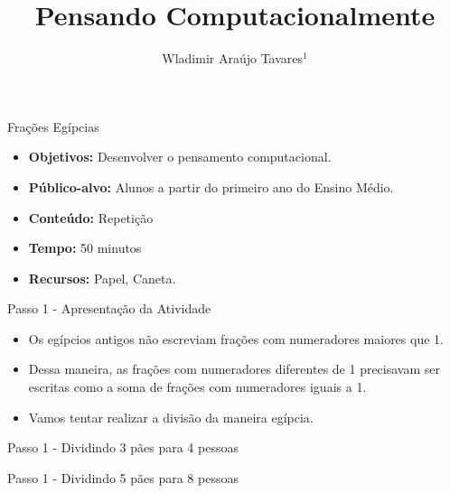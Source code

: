 \documentclass{beamer}
\title {Pensando Computacionalmente}
\author[Wladimir Araújo Tavares]{ Wladimir Araújo Tavares$^{1}$  }
\institute[UFC]{$^{1}$Universidade Federal do Ceará - Campus de Quixadá\\}
\date{}
\begin{document}
\begin{frame}
	\titlepage
\end{frame}




\begin{frame}{Frações Egípcias}

\begin{itemize}
\item \textbf{Objetivos:} Desenvolver o pensamento computacional.

\item \textbf{Público-alvo:}  Alunos a partir do primeiro ano do Ensino Médio.

\item \textbf{Conteúdo:} Repetição

\item \textbf{Tempo:} 50 minutos

\item \textbf{Recursos:} Papel, Caneta.

\end{itemize}
    
\end{frame}


\begin{frame}{Passo 1 - Apresentação da Atividade}

\begin{itemize}
   
\item <1-> Os egípcios antigos não escreviam frações com numeradores maiores que 1. 

\item Dessa maneira, as frações com numeradores diferentes de 1 precisavam ser escritas como a soma de frações com numeradores iguais a 1.

\item Vamos tentar realizar a divisão da maneira egípcia.

\end{itemize}

\end{frame}


\begin{frame}{Passo 1 - Dividindo 3 pães para 4 pessoas}


\end{frame}


\begin{frame}{Passo 1 - Dividindo 5 pães para 8 pessoas}


\end{frame}
\end{document}
